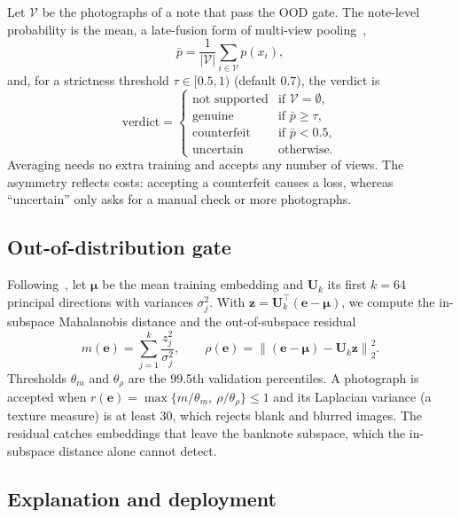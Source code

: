 \documentclass[pdflatex,iicol,sn-mathphys-num]{sn-jnl}
\begin{document}
Let $\mathcal{V}$ be the photographs of a note that pass the OOD gate. The note-level
probability is the mean, a late-fusion form of multi-view pooling~\cite{su2015mvcnn},
\begin{equation}
\bar{p} = \frac{1}{|\mathcal{V}|}\sum_{i\in\mathcal{V}} p(x_i),
\label{eq:fusion}
\end{equation}
and, for a strictness threshold $\tau\in[0.5,1)$ (default 0.7), the verdict is
\begin{equation}
\text{verdict} =
\begin{cases}
\text{not supported} & \text{if } \mathcal{V}=\emptyset,\\
\text{genuine} & \text{if } \bar{p}\ge\tau,\\
\text{counterfeit} & \text{if } \bar{p}<0.5,\\
\text{uncertain} & \text{otherwise.}
\end{cases}
\label{eq:decision}
\end{equation}
Averaging needs no extra training and accepts any number of views. The asymmetry
reflects costs: accepting a counterfeit causes a loss, whereas ``uncertain'' only asks
for a manual check or more photographs.

\subsection{Out-of-distribution gate}\label{sec:ood}

Following~\cite{lee2018mahalanobis}, let $\boldsymbol{\mu}$ be the mean training
embedding and $\mathbf{U}_k$ its first $k=64$ principal directions with variances
$\sigma_j^2$. With $\mathbf{z}=\mathbf{U}_k^{\top}(\mathbf{e}-\boldsymbol{\mu})$, we
compute the in-subspace Mahalanobis distance and the out-of-subspace residual
\begin{equation}
m(\mathbf{e}) = \sum_{j=1}^{k}\frac{z_j^2}{\sigma_j^2},\qquad
\rho(\mathbf{e}) = \left\lVert(\mathbf{e}-\boldsymbol{\mu})-\mathbf{U}_k\mathbf{z}\right\rVert_2^2 .
\label{eq:ood}
\end{equation}
Thresholds $\theta_m$ and $\theta_\rho$ are the 99.5th validation percentiles. A
photograph is accepted when $r(\mathbf{e})=\max\{m/\theta_m,\ \rho/\theta_\rho\}\le1$
and its Laplacian variance (a texture measure) is at least 30, which rejects blank and
blurred images. The residual catches embeddings that leave the banknote subspace, which
the in-subspace distance alone cannot detect.

\subsection{Explanation and deployment}\label{sec:deploy}
\end{document}
